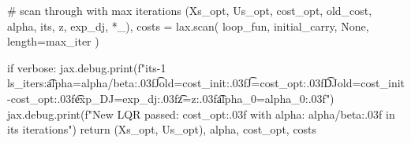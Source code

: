     # scan through with max iterations
    (Xs_opt, Us_opt, cost_opt, old_cost, alpha, its, z, exp_dj, *_), costs = lax.scan(
        loop_fun, initial_carry, None, length=max_iter
    )
    
    if verbose:
        jax.debug.print(f"{its-1} ls_iters:\t alpha={alpha/beta:.03f}\t Jold={cost_init:.03f}\t J={cost_opt:.03f}\t DJold={cost_init-cost_opt:.03f}\t exp_DJ={exp_dj:.03f}\t z={z:.03f}\t alpha_0={alpha_0:.03f}")
        jax.debug.print(f"New LQR passed: {cost_opt:.03f} with alpha: {alpha/beta:.03f} in {its} iterations")
    return (Xs_opt, Us_opt), alpha, cost_opt, costs

